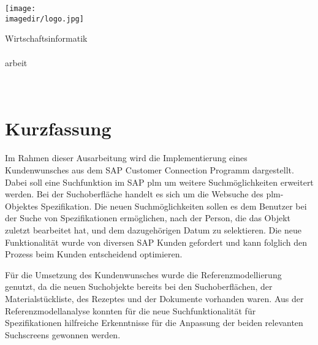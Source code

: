 \thispagestyle{plain}
\begin{minipage}{\textwidth}
        \vspace{-2cm}
        \noindent  \hfill \texttt{[image: \\imagedir/logo.jpg]}
    \end{minipage}
\begin{flushright}
        \footnotesize{Wirtschaftsinformatik}\\
        \medskip
        \small{\textbf{\DerTitelDerArbeit}}\\
        \medskip
        \footnotesize{{\DieArtDerArbeit}arbeit}\\
        \footnotesize{\DerAutorDerArbeit}\\
        \footnotesize{\DerNameDerFirma}\\
\end{flushright}

\section*{Kurzfassung}

Im Rahmen dieser Ausarbeitung wird die Implementierung eines Kundenwunsches aus dem SAP Customer Connection Programm dargestellt. Dabei soll eine Suchfunktion im SAP \ac{plm} um weitere Suchmöglichkeiten erweitert werden. Bei der Suchoberfläche handelt es sich um die Websuche des \ac{plm}-Objektes Spezifikation. Die neuen Suchmöglichkeiten sollen es dem Benutzer bei der Suche von Spezifikationen ermöglichen, nach der Person, die das Objekt zuletzt bearbeitet hat, und dem dazugehörigen Datum zu selektieren. Die neue Funktionalität wurde von diversen SAP Kunden gefordert und kann folglich den Prozess beim Kunden entscheidend optimieren.

Für die Umsetzung des Kundenwunsches wurde die Referenzmodellierung genutzt, da die neuen Suchobjekte bereits bei den Suchoberflächen, der Materialstückliste, des Rezeptes und der Dokumente vorhanden waren. Aus der Referenzmodellanalyse konnten für die neue Suchfunktionalität für Spezifikationen hilfreiche Erkenntnisse für die Anpassung der beiden relevanten Suchscreens gewonnen werden.


